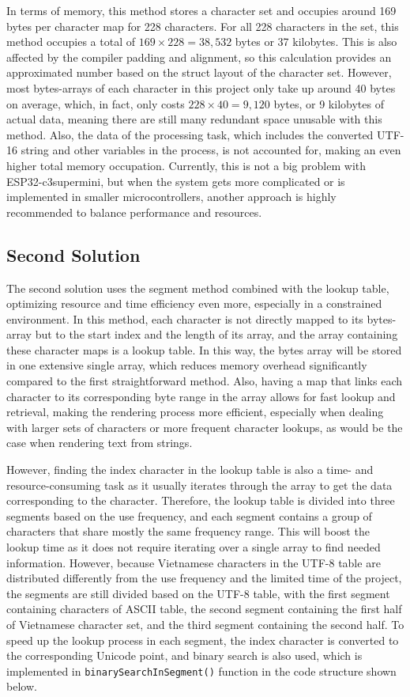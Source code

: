 \documentclass[../Main.tex]{subfiles}
\begin{document}
In terms of memory, this method stores a character set and occupies around 169 bytes per character map for 228 characters. For all 228 characters in the set, this method occupies a total of \(169 \times 228 = 38,532\) bytes or 37 kilobytes. This is also affected by the compiler padding and alignment, so this calculation provides an approximated number based on the struct layout of the character set. However, most bytes-arrays of each character in this project only take up around 40 bytes on average, which, in fact, only costs \(228 \times 40 = 9,120\) bytes, or 9 kilobytes of actual data, meaning there are still many redundant space unusable with this method. Also, the data of the processing task, which includes the converted UTF-16 string and other variables in the process, is not accounted for, making an even higher total memory occupation. Currently, this is not a big problem with ESP32-c3supermini, but when the system gets more complicated or is implemented in smaller microcontrollers, another approach is highly recommended to balance performance and resources.

\subsection{Second Solution}
The second solution uses the segment method combined with the lookup table, optimizing resource and time efficiency even more, especially in a constrained environment. In this method, each character is not directly mapped to its bytes-array but to the start index and the length of its array, and the array containing these character maps is a lookup table. In this way, the bytes array will be stored in one extensive single array, which reduces memory overhead significantly compared to the first straightforward method. Also, having a map that links each character to its corresponding byte range in the array allows for fast lookup and retrieval, making the rendering process more efficient, especially when dealing with larger sets of characters or more frequent character lookups, as would be the case when rendering text from strings.

However, finding the index character in the lookup table is also a time- and resource-consuming task as it usually iterates through the array to get the data corresponding to the character. Therefore, the lookup table is divided into three segments based on the use frequency, and each segment contains a group of characters that share mostly the same frequency range. This will boost the lookup time as it does not require iterating over a single array to find needed information. However, because Vietnamese characters in the UTF-8 table are distributed differently from the use frequency and the limited time of the project, the segments are still divided based on the UTF-8 table, with the first segment containing characters of ASCII table, the second segment containing the first half of Vietnamese character set, and the third segment containing the second half. To speed up the lookup process in each segment, the index character is converted to the corresponding Unicode point, and binary search is also used, which is implemented in \verb|binarySearchInSegment()| function in the code structure shown below.
\end{document}
